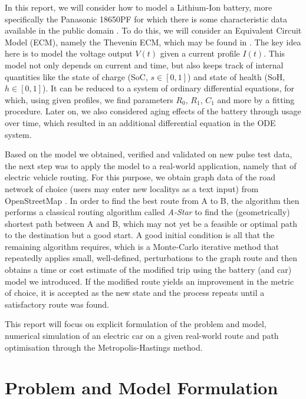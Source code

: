 \documentclass{prettytex/ox/mmsc-special-topic}
\begin{document}
  In this report, we will consider how to model a Lithium-Ion battery, more specifically the Panasonic 18650PF for which there is some characteristic data available in the public domain \parencite{panasonicnums}.
  To do this, we will consider an Equivalent Circuit Model (ECM), namely the Thevenin ECM, which may be found in .
  The key idea here is to model the voltage output $V(t)$ given a current profile $I(t)$.
  This model not only depends on current and time, but also keeps track of internal quantities like the state of charge (SoC, $s \in [0, 1]$) and state of health (SoH, $h \in [0, 1]$).
  It can be reduced to a system of ordinary differential equations, for which, using given profiles, we find parameters $R_0$, $R_1$, $C_1$ and more by a fitting procedure.
  Later on, we also considered aging effects of the battery through usage over time, which resulted in an additional differential equation in the ODE system.

  Based on the model we obtained, verified and validated on new pulse test data, the next step was to apply the model to a real-world application, namely that of electric vehicle routing.
  For this purpose, we obtain graph data of the road network of choice (users may enter new localitys as a text input) from OpenStreetMap \parencite{osm}.
  In order to find the best route from A to B, the algorithm then performs a classical routing algorithm called \emph{A-Star} to find the (geometrically) shortest path between A and B, which may not yet be a feasible or optimal path to the destination but a good start.
  A good initial condition is all that the remaining algorithm requires, which is a Monte-Carlo iterative method that repeatedly applies small, well-defined, perturbations to the graph route and then obtains a time or cost estimate of the modified trip using the battery (and car) model we introduced.
  If the modified route yields an improvement in the metric of choice, it is accepted as the new state and the process repeats until a satisfactory route was found.

  This report will focus on explicit formulation of the problem and model, numerical simulation of an electric car on a given real-world route and path optimisation through the Metropolis-Hastings method.

  \section{Problem and Model Formulation}
\end{document}
